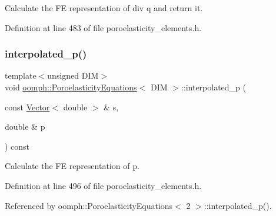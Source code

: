 Calculate the FE representation of div q and return it. 



Definition at line 483 of file poroelasticity\+\_\+elements.\+h.

\mbox{\label{classoomph_1_1PoroelasticityEquations_a5e15413423cccf35153ac009667e0297}} 
\subsubsection{\texorpdfstring{interpolated\+\_\+p()}{interpolated\_p()}\hspace{0.1cm}{\footnotesize\ttfamily [1/2]}}
{\footnotesize\ttfamily template$<$unsigned D\+IM$>$ \\
void \hyperlink{classoomph_1_1PoroelasticityEquations}{oomph\+::\+Poroelasticity\+Equations}$<$ D\+IM $>$\+::interpolated\+\_\+p (\begin{DoxyParamCaption}\item[{const \hyperlink{classoomph_1_1Vector}{Vector}$<$ double $>$ \&}]{s,  }\item[{double \&}]{p }\end{DoxyParamCaption}) const\hspace{0.3cm}{\ttfamily [inline]}}



Calculate the FE representation of p. 



Definition at line 496 of file poroelasticity\+\_\+elements.\+h.



Referenced by oomph\+::\+Poroelasticity\+Equations$<$ 2 $>$\+::interpolated\+\_\+p().

\mbox{\label{classoomph_1_1PoroelasticityEquations_ac26b9aaf9872c24d0d99ab651d59196f}} 

